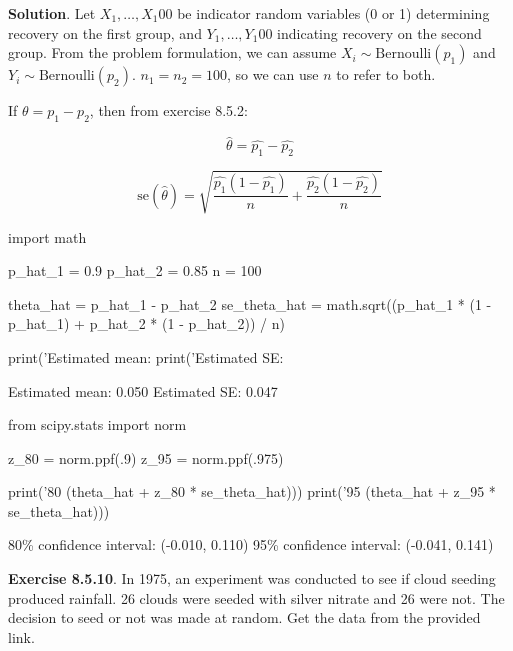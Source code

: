 \textbf{Solution}. Let \(X_{1}, \dots, X_{1}00\) be indicator random
variables (0 or 1) determining recovery on the first group, and
\(Y_{1}, \dots, Y_{1}00\) indicating recovery on the second group. From the
problem formulation, we can assume \(X_{i} \sim \text{Bernoulli}(p_{1})\)
and \(Y_{i} \sim \text{Bernoulli}(p_{2})\). \(n_{1} = n_{2} = 100\), so we can
use \(n\) to refer to both.

If \(\theta = p_{1} - p_{2}\), then from exercise 8.5.2:

\[\hat{\theta} = \hat{p_{1}} - \hat{p_{2}}\]

\[\text{se}(\hat{\theta}) = \sqrt{\frac{\hat{p_{1}}(1 - \hat{p_{1}})}{n} + \frac{\hat{p_{2}}(1 - \hat{p_{2}})}{n}}\]

\begin{python}
import math

p_hat_{1} = 0.9
p_hat_{2} = 0.85
n = 100

theta_hat = p_hat_{1} - p_hat_{2}
se_theta_hat = math.sqrt((p_hat_{1} * (1 - p_hat_{1}) + p_hat_{2} * (1 - p_hat_{2})) / n)

print('Estimated mean: %
print('Estimated SE: %
\end{python}

\begin{console}
Estimated mean: 0.050
Estimated SE: 0.047
\end{console}

\begin{python}
from scipy.stats import norm

z_80 = norm.ppf(.9)
z_95 = norm.ppf(.975)

print('80%
                                                 (theta_hat + z_80 * se_theta_hat)))
print('95%
                                                 (theta_hat + z_95 * se_theta_hat)))
\end{python}

\begin{console}
80\% confidence interval: (-0.010, 0.110)
95\% confidence interval: (-0.041, 0.141)
\end{console}

\textbf{Exercise 8.5.10}. In 1975, an experiment was conducted to see if
cloud seeding produced rainfall. 26 clouds were seeded with silver
nitrate and 26 were not. The decision to seed or not was made at random.
Get the data from the provided link.


